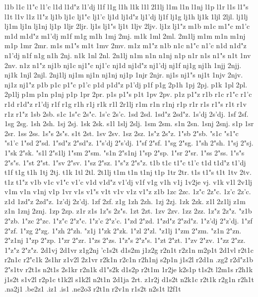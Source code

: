 l1b
l1c
l1"c
l1'c
l1d
l1d"z
l1'dj
l1f
l1g
l1h
l1k
l1l
2l1lj
l1m
l1n
l1nj
l1p
l1r
l1s
l1"s
l1t
l1v
l1z
l1"z
lj1b
lj1c
lj1"c
lj1'c
lj1d
lj1d"z
lj1'dj
lj1f
lj1g
lj1h
lj1k
1ljl
2ljl.
lj1lj
lj1m
lj1n
lj1nj
lj1p
1ljr
2ljr.
lj1s
lj1"s
lj1t
1ljv
2ljv.
lj1z
lj1"z
m1b
m1c
m1"c
m1'c
m1d
m1d"z
m1'dj
m1f
m1g
m1h
1mj
2mj.
m1k
1ml
2ml.
2m1lj
m1m
m1n
m1nj
m1p
1mr
2mr.
m1s
m1"s
m1t
1mv
2mv.
m1z
m1"z
n1b
n1c
n1"c
n1'c
n1d
n1d"z
n1'dj
n1f
n1g
n1h
2nj.
n1k
1nl
2nl.
2n1lj
n1m
n1n
n1nj
n1p
n1r
n1s
n1"s
n1t
1nv
2nv.
n1z
n1"z
nj1b
nj1c
nj1"c
nj1'c
nj1d
nj1d"z
nj1'dj
nj1f
nj1g
nj1h
1njj
2njj.
nj1k
1njl
2njl.
2nj1lj
nj1m
nj1n
nj1nj
nj1p
1njr
2njr.
nj1s
nj1"s
nj1t
1njv
2njv.
nj1z
nj1"z
p1b
p1c
p1"c
p1'c
p1d
p1d"z
p1'dj
p1f
p1g
2p1h
1pj
2pj.
p1k
1pl
2pl.
2p1lj
p1m
p1n
p1nj
p1p
1pr
2pr.
p1s
p1"s
p1t
1pv
2pv.
p1z
p1"z
r1b
r1c
r1"c
r1'c
r1d
r1d"z
r1'dj
r1f
r1g
r1h
r1j
r1k
r1l
2r1lj
r1m
r1n
r1nj
r1p
r1r
r1s
r1"s
r1t
r1v
r1z
r1"z
1sb
2sb.
s1c
1s"c
2s"c.
1s'c
2s'c.
1sd
2sd.
1sd"z
2sd"z.
1s'dj
2s'dj.
1sf
2sf.
1sg
2sg.
1sh
2sh.
1sj
2sj.
1sk
2sk.
s1l
1slj
2slj.
1sm
2sm.
s1n
2sn.
1snj
2snj.
s1p
1sr
2sr.
1ss
2ss.
1s"s
2s"s.
s1t
2st.
1sv
2sv.
1sz
2sz.
1s"z
2s"z.
1"sb
2"sb.
"s1c
"s1"c
"s1'c
1"sd
2"sd.
1"sd"z
2"sd"z.
1"s'dj
2"s'dj.
1"sf
2"sf.
1"sg
2"sg.
1"sh
2"sh.
1"sj
2"sj.
1"sk
2"sk.
"s1l
2"s1lj
1"sm
2"sm.
"s1n
2"s1nj
1"sp
2"sp.
1"sr
2"sr.
1"ss
2"ss.
1"s"s
2"s"s.
1"st
2"st.
1"sv
2"sv.
1"sz
2"sz.
1"s"z
2"s"z.
t1b
t1c
t1"c
t1'c
t1d
t1d"z
t1'dj
t1f
t1g
t1h
1tj
2tj.
t1k
1tl
2tl.
2t1lj
t1m
t1n
t1nj
t1p
1tr
2tr.
t1s
t1"s
t1t
1tv
2tv.
t1z
t1"z
v1b
v1c
v1"c
v1'c
v1d
v1d"z
v1'dj
v1f
v1g
v1h
v1j
1v2je
vj.
v1k
v1l
2v1lj
v1m
v1n
v1nj
v1p
1vr
v1s
v1"s
v1t
v1v
v1z
v1"z
z1b
1zc
2zc.
1z"c
2z"c.
1z'c
2z'c.
z1d
1zd"z
2zd"z.
1z'dj
2z'dj.
1zf
2zf.
z1g
1zh
2zh.
1zj
2zj.
1zk
2zk.
z1l
2z1lj
z1m
z1n
1znj
2znj.
1zp
2zp.
z1r
z1s
1z"s
2z"s.
1zt
2zt.
1zv
2zv.
1zz
2zz.
1z"z
2z"z.
"z1b
2"zb.
1"zc
2"zc.
1"z"c
2"z"c.
1"z'c
2"z'c.
1"zd
2"zd.
1"zd"z
2"zd"z.
1"z'dj
2"z'dj.
1"zf
2"zf.
1"zg
2"zg.
1"zh
2"zh.
"z1j
1"zk
2"zk.
1"zl
2"zl.
"z1lj
1"zm
2"zm.
"z1n
2"zn.
2"z1nj
1"zp
2"zp.
1"zr
2"zr.
1"zs
2"zs.
1"z"s
2"z"s.
1"zt
2"zt.
1"zv
2"zv.
1"zz
2"zz.
1"z"z
2"z"z.
2d1vj
2d1vr
z1g2nj
'c1s2t
d1s2m
j1z2g
r2n1t
r2z1n
m2p1t
2d1vl
r2t1c
r2n1c
r2"c1k
2s1hr
z1v2l
2z1vr
r2k1n
r2c1n
r2h1nj
s2p1n
j1s2l
r2d1n
.zg2
r2d"z1b
2"s1tv
r2t1s
n2t1s
2s1kr
r2n1k
d1"s2k
d1s2p
r2t1m
1r2je
k2s1p
t1s2t
l2m1s
r2h1k
j1s2t
s1v2l
r2p1c
t1k2l
s1k2l
n2t1n
2d1ja
2rt.
z1r2j
d1s2t
n2k1c
r2t1k
r2g1n
r2h1t
.na2j1
.be2z1
.iz1
.is1
.ne2o3
r2t1n
r2v1n
r1s2t
n2s1t
l2f1t